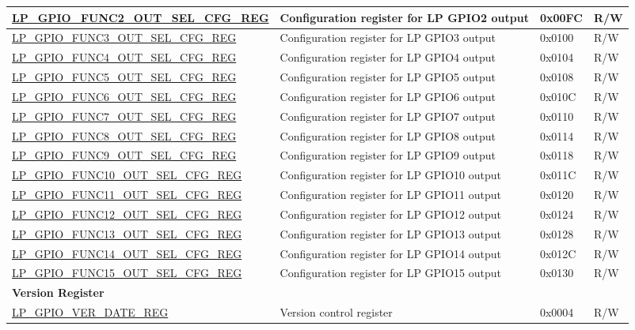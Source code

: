 \begin{longtable}{ | p{6.2cm} | p{6.9cm} | p{1.3cm} | p{1.8cm} | }
\hyperref[regdesc:LPGPIOFUNCNOUTSELCFGREG]{LP\_GPIO\_FUNC2\_OUT\_SEL\_CFG\_REG} & Configuration register for LP GPIO2 output & 0x00FC & R/W \\ \hline
\hyperref[regdesc:LPGPIOFUNCNOUTSELCFGREG]{LP\_GPIO\_FUNC3\_OUT\_SEL\_CFG\_REG} & Configuration register for LP GPIO3 output & 0x0100 & R/W \\ \hline
\hyperref[regdesc:LPGPIOFUNCNOUTSELCFGREG]{LP\_GPIO\_FUNC4\_OUT\_SEL\_CFG\_REG} & Configuration register for LP GPIO4 output & 0x0104 & R/W \\ \hline
\hyperref[regdesc:LPGPIOFUNCNOUTSELCFGREG]{LP\_GPIO\_FUNC5\_OUT\_SEL\_CFG\_REG} & Configuration register for LP GPIO5 output & 0x0108 & R/W \\ \hline
\hyperref[regdesc:LPGPIOFUNCNOUTSELCFGREG]{LP\_GPIO\_FUNC6\_OUT\_SEL\_CFG\_REG} & Configuration register for LP GPIO6 output & 0x010C & R/W \\ \hline
\hyperref[regdesc:LPGPIOFUNCNOUTSELCFGREG]{LP\_GPIO\_FUNC7\_OUT\_SEL\_CFG\_REG} & Configuration register for LP GPIO7 output & 0x0110 & R/W \\ \hline
\hyperref[regdesc:LPGPIOFUNCNOUTSELCFGREG]{LP\_GPIO\_FUNC8\_OUT\_SEL\_CFG\_REG} & Configuration register for LP GPIO8 output & 0x0114 & R/W \\ \hline
\hyperref[regdesc:LPGPIOFUNCNOUTSELCFGREG]{LP\_GPIO\_FUNC9\_OUT\_SEL\_CFG\_REG} & Configuration register for LP GPIO9 output & 0x0118 & R/W \\ \hline
\hyperref[regdesc:LPGPIOFUNCNOUTSELCFGREG]{LP\_GPIO\_FUNC10\_OUT\_SEL\_CFG\_REG} & Configuration register for LP GPIO10 output & 0x011C & R/W \\ \hline
\hyperref[regdesc:LPGPIOFUNCNOUTSELCFGREG]{LP\_GPIO\_FUNC11\_OUT\_SEL\_CFG\_REG} & Configuration register for LP GPIO11 output & 0x0120 & R/W \\ \hline
\hyperref[regdesc:LPGPIOFUNCNOUTSELCFGREG]{LP\_GPIO\_FUNC12\_OUT\_SEL\_CFG\_REG} & Configuration register for LP GPIO12 output & 0x0124 & R/W \\ \hline
\hyperref[regdesc:LPGPIOFUNCNOUTSELCFGREG]{LP\_GPIO\_FUNC13\_OUT\_SEL\_CFG\_REG} & Configuration register for LP GPIO13 output & 0x0128 & R/W \\ \hline
\hyperref[regdesc:LPGPIOFUNCNOUTSELCFGREG]{LP\_GPIO\_FUNC14\_OUT\_SEL\_CFG\_REG} & Configuration register for LP GPIO14 output & 0x012C & R/W \\ \hline
\hyperref[regdesc:LPGPIOFUNCNOUTSELCFGREG]{LP\_GPIO\_FUNC15\_OUT\_SEL\_CFG\_REG} & Configuration register for LP GPIO15 output & 0x0130 & R/W \\ \hline
\multicolumn{4}{|l|}{\textbf{Version Register}} \\ \hline
\hyperref[regdesc:LPGPIOVERDATEREG]{LP\_GPIO\_VER\_DATE\_REG} & Version control register & 0x0004 & R/W \\ \hline
\end{longtable}
